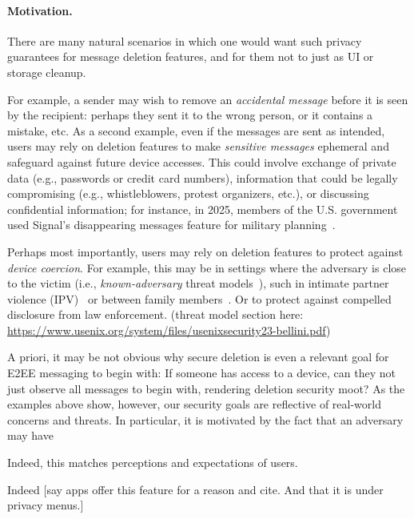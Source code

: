 
\paragraph{Motivation.} There are many natural scenarios in which one would want such privacy guarantees for message deletion features, and for them not to just as UI or storage cleanup. 


For example, a sender may wish to remove an \emph{accidental message} before it is seen by the recipient: perhaps they sent it to the wrong person, or it contains a mistake, etc. As a second example, even if the messages are sent as intended, users may rely on deletion features to make \emph{sensitive messages} ephemeral and safeguard against future device accesses. This could involve exchange of private data (e.g., passwords or credit card numbers), information that could be legally compromising (e.g., whistleblowers, protest organizers, etc.), or discussing confidential information; for instance, in 2025, members of the U.S. government used Signal's disappearing messages feature for military planning~\cite{enwiki:1346011653}.

Perhaps most importantly, users may rely on deletion features to protect against \emph{device coercion}. For example, this may be in settings where the adversary is close to the victim (i.e., \emph{known-adversary} threat models~\cite{}), such in intimate partner violence (IPV)~\cite{} or between family members~\cite{}. Or to protect against compelled disclosure from law enforcement. (threat model section here: \url{https://www.usenix.org/system/files/usenixsecurity23-bellini.pdf})
 
A priori, it may be not obvious why secure deletion is even a relevant goal for E2EE messaging to begin with: If someone has access to a device, can they not just observe all messages to begin with, rendering deletion security moot?  As the examples above show, however, our security goals are reflective of real-world concerns and threats. In particular, it is motivated by the fact that an adversary may have 

Indeed, this matches perceptions and expectations of users. 

Indeed [say apps offer this feature for a reason and cite. And that it is under privacy menus.]

